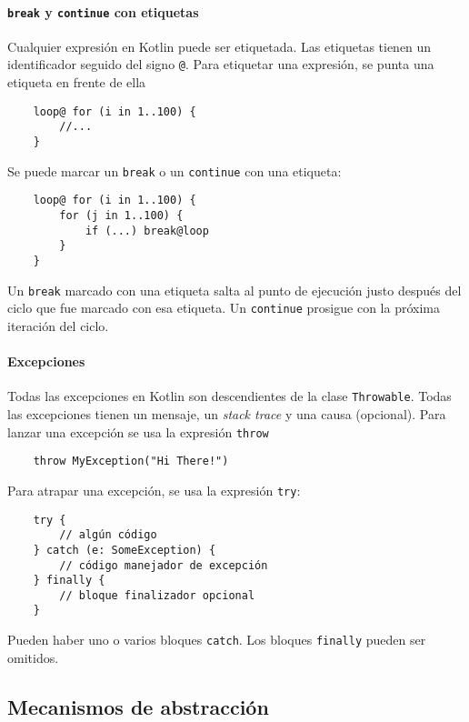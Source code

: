 \paragraph{\texttt{break} y \texttt{continue} con etiquetas}
Cualquier expresión en Kotlin puede ser etiquetada. Las etiquetas tienen un identificador seguido del signo \texttt{@}. Para etiquetar una expresión, se punta una etiqueta en frente de ella
\begin{verbatim}
    loop@ for (i in 1..100) {
        //...
    }
\end{verbatim}

Se puede marcar un \texttt{break} o un \texttt{continue} con una etiqueta:
\begin{verbatim}
    loop@ for (i in 1..100) {
        for (j in 1..100) {
            if (...) break@loop
        }
    }
\end{verbatim}
Un \texttt{break} marcado con una etiqueta salta al punto de ejecución justo después del ciclo que fue marcado con esa etiqueta. Un \texttt{continue} prosigue con la próxima iteración del ciclo.

\paragraph{Excepciones}
Todas las excepciones en Kotlin son descendientes de la clase \texttt{Throwable}. Todas las excepciones tienen un mensaje, un \emph{stack trace} y una causa (opcional). Para lanzar una excepción se usa la expresión \texttt{throw}
\begin{verbatim}
    throw MyException("Hi There!")
\end{verbatim}

Para atrapar una excepción, se usa la expresión \texttt{try}:
\begin{verbatim}
    try {
        // algún código
    } catch (e: SomeException) {
        // código manejador de excepción
    } finally {
        // bloque finalizador opcional
    }
\end{verbatim}
Pueden haber uno o varios bloques \texttt{catch}. Los bloques \texttt{finally} pueden ser omitidos. 

\subsection{Mecanismos de abstracción}

